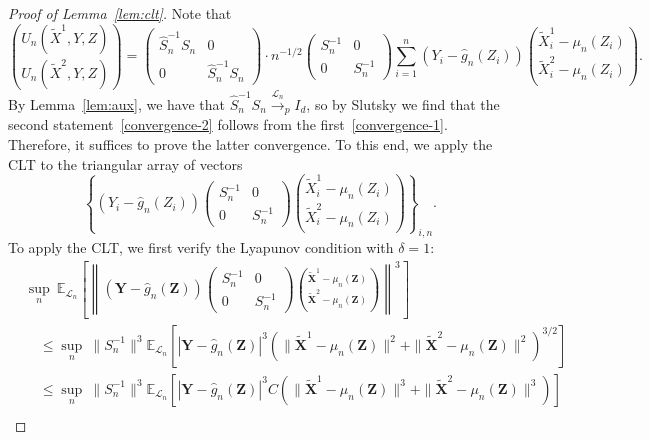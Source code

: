 \documentclass[ejs]{imsart}
\numberwithin{equation}{section}
\theoremstyle{plain}
\theoremstyle{definition}
\theoremstyle{remark}
\newcommand{\prz}{\bm Z}
\newcommand{\srz}{Z}
\newcommand{\prxk}{{{\widetilde{\bm X}}}}
\newcommand{\srxk}{\widetilde X}
\newcommand{\pry}{{\bm Y}}
\newcommand{\sry}{Y}
\begin{document}
\begin{proof}[Proof of Lemma~\ref{lem:clt}]
	
	Note that
	\begin{equation*}
		{U_n(\srxk^1, \sry, \srz) \choose U_n(\srxk^2, \sry, \srz)} = \begin{pmatrix}
			\widehat S_n^{-1}S_n & 0 \\
			0 & \widehat S_n^{-1}S_n
		\end{pmatrix} \cdot n^{-1/2}
		\begin{pmatrix}
			S_n^{-1} & 0 \\
			0 & S_n^{-1}
		\end{pmatrix}\sum_{i = 1}^n(\sry_{i} - \widehat g_n(\srz_{i})) {\srxk^1_{i} - \mu_n(\srz_i) \choose \srxk^2_{i} - \mu_n(\srz_i)}.
	\end{equation*}
	By Lemma~\ref{lem:aux}, we have that $\widehat S_n^{-1}S_n \overset{\mathcal L_n}\rightarrow_p I_d$, so by Slutsky we find that the second statement~\eqref{convergence-2} follows from the first~\eqref{convergence-1}. Therefore, it suffices to prove the latter convergence. To this end, we apply the CLT to the triangular array of vectors
	\begin{equation}
		\left\{ (\sry_{i} - \widehat g_n(\srz_{i}))\begin{pmatrix}
			S_n^{-1} & 0 \\
			0 & S_n^{-1}
		\end{pmatrix}{\srxk^1_{i} - \mu_n(\srz_i) \choose \srxk^2_{i} - \mu_n(\srz_i)}\right\}_{i,n}. 
	\end{equation}
	To apply the CLT, we first verify the Lyapunov condition with $\delta = 1$: 
	\begin{equation}
		\begin{split}
			&\sup_{n}\ \mathbb E_{\mathcal L_n}\left[\left\|(\pry- \widehat g_n(\prz))
			\begin{pmatrix}
				S_n^{-1} & 0 \\
				0 & S_n^{-1}
			\end{pmatrix}{\prxk^1 - \mu_n(\prz) \choose \prxk^2 - \mu_n(\prz)}\right\|^3\right] \\
			&\quad \leq \sup_{n}\ \|S_n^{-1}\|^3 \mathbb E_{\mathcal L_n}\left[|\pry- \widehat g_n(\prz)|^3(\|\prxk^1 - \mu_n(\prz)\|^2 + \|\prxk^2 - \mu_n(\prz)\|^2)^{3/2}\right] \\
			&\quad \leq \sup_{n}\ \|S_n^{-1}\|^3 \mathbb E_{\mathcal L_n}\left[|\pry- \widehat g_n(\prz)|^3C\left(\|\prxk^1 - \mu_n(\prz)\|^3 + \|\prxk^2 - \mu_n(\prz)\|^3\right)\right] \\

\end{split}
\end{equation}
\end{proof}
\end{document}
